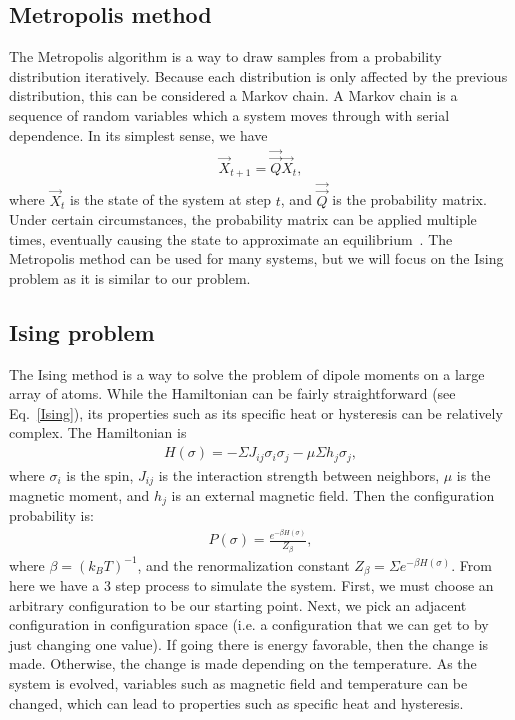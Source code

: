 \subsection{Metropolis method}
The Metropolis algorithm is a way to draw samples from a probability distribution iteratively. Because each distribution is only affected by the previous distribution, this can be considered a Markov chain. A Markov chain is a sequence of random variables which a system moves through with serial dependence. In its simplest sense, we have
\begin{eqnarray}
\overrightarrow X_{t+1} = \overrightarrow{ \overrightarrow Q} \overrightarrow X_{t} ,
\label{Markov}
\end{eqnarray}
where $\overrightarrow X_t$ is the state of the system at step $t$, and $\overrightarrow{\overrightarrow Q}$ is the probability matrix. Under certain circumstances, the probability matrix can be applied multiple times, eventually causing the state to approximate an equilibrium~\cite{Everitt02}. The Metropolis method can be used for many systems, but we will focus on the Ising problem as it is similar to our problem.

\subsection{Ising problem}
The Ising method is a way to solve the problem of dipole moments on a large array of atoms. While the Hamiltonian can be fairly straightforward (see Eq.~\ref{Ising}), its properties such as its specific heat or hysteresis can be relatively complex.
The Hamiltonian is
\begin{eqnarray}
H(\sigma) = - \Sigma J_{ij} \sigma_i \sigma_j - \mu \Sigma h_j \sigma_j , 
\label{Ising}
\end{eqnarray}
where $\sigma_i$ is the spin, $J_{ij}$ is the interaction strength between neighbors, $\mu$ is the magnetic moment, and $h_j$ is an external magnetic field. Then the configuration probability is:
\begin{eqnarray}
P(\sigma) = \frac {e^{-\beta H(\sigma) }} {Z_\beta },
\label{configurationProbability}
\end{eqnarray}
where $\beta = (k_B T)^{-1}$, and the renormalization constant $Z_\beta = \Sigma e^{-\beta H(\sigma)}$. From here we have a 3 step process to simulate the system. First, we must choose an arbitrary configuration to be our starting point. Next, we pick an adjacent configuration in configuration space (i.e. a configuration that we can get to by just changing one value). If going there is energy favorable, then the change is made. Otherwise, the change is made depending on the temperature. As the system is evolved, variables such as magnetic field and temperature can be changed, which can lead to properties such as specific heat and hysteresis. 

